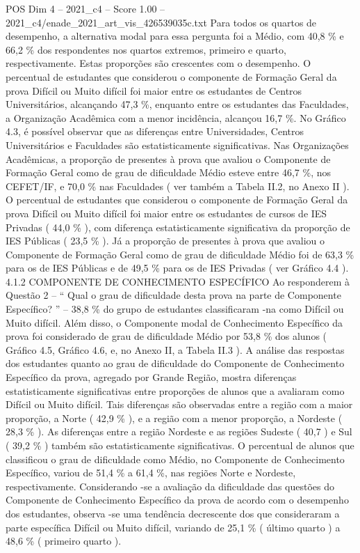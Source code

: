 \begin{textsample}{POS Dim 4 – 2021\_c4 – Score 1.00 – 2021\_c4/enade\_2021\_art\_vis\_426539035c.txt}
Para todos os quartos de desempenho, a alternativa modal para essa pergunta foi a Médio, com 40,8 \% e 66,2 \% dos respondentes nos quartos extremos, primeiro e quarto, respectivamente.
Estas proporções são crescentes com o desempenho.
O percentual de estudantes que considerou o componente de Formação Geral da prova Difícil ou Muito difícil foi maior entre os estudantes de Centros Universitários, alcançando 47,3 \%, enquanto entre os estudantes das Faculdades, a Organização Acadêmica com a menor incidência, alcançou 16,7 \%.
No Gráfico 4.3, é possível observar que as diferenças entre Universidades, Centros Universitários e Faculdades são estatisticamente significativas.
Nas Organizações Acadêmicas, a proporção de presentes à prova que avaliou o Componente de Formação Geral como de grau de dificuldade Médio esteve entre 46,7 \%, nos CEFET/IF, e 70,0 \% nas Faculdades ( ver também a Tabela II.2, no Anexo II ).
O percentual de estudantes que considerou o componente de Formação Geral da prova Difícil ou Muito difícil foi maior entre os estudantes de cursos de IES Privadas ( 44,0 \% ), com diferença estatisticamente significativa da proporção de IES Públicas ( 23,5 \% ).
Já a proporção de presentes à prova que avaliou o Componente de Formação Geral como de grau de dificuldade Médio foi de 63,3 \% para os de IES Públicas e de 49,5 \% para os de IES Privadas ( ver Gráfico 4.4 ). 4.1.2 COMPONENTE DE CONHECIMENTO ESPECÍFICO Ao responderem à Questão 2 – “ Qual o grau de dificuldade desta prova na parte de Componente Específico? ” – 38,8 \% do grupo de estudantes classificaram -na como Difícil ou Muito difícil.
Além disso, o Componente modal de Conhecimento Específico da prova foi considerado de grau de dificuldade Médio por 53,8 \% dos alunos ( Gráfico 4.5, Gráfico 4.6, e, no Anexo II, a Tabela II.3 ).
A análise das respostas dos estudantes quanto ao grau de dificuldade do Componente de Conhecimento Específico da prova, agregado por Grande Região, mostra diferenças estatisticamente significativas entre proporções de alunos que a avaliaram como Difícil ou Muito difícil.
Tais diferenças são observadas entre a região com a maior proporção, a Norte ( 42,9 \% ), e a região com a menor proporção, a Nordeste ( 28,3 \% ).
As diferenças entre a região Nordeste e as regiões Sudeste ( 40,7 ) e Sul ( 39,2 \% ) também são estatisticamente significativas.
O percentual de alunos que classificou o grau de dificuldade como Médio, no Componente de Conhecimento Específico, variou de 51,4 \% a 61,4 \%, nas regiões Norte e Nordeste, respectivamente.
Considerando -se a avaliação da dificuldade das questões do Componente de Conhecimento Específico da prova de acordo com o desempenho dos estudantes, observa -se uma tendência decrescente dos que consideraram a parte específica Difícil ou Muito difícil, variando de 25,1 \% ( último quarto ) a 48,6 \% ( primeiro quarto ).

\end{textsample}
